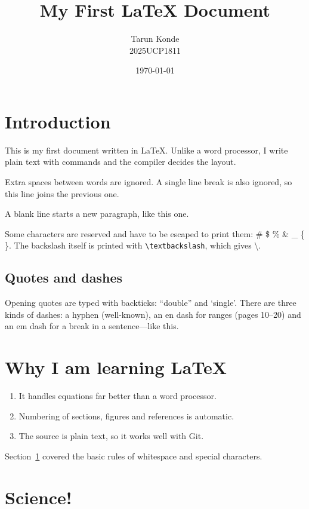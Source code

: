 \documentclass[12pt,a4paper]{article}
\title{My First \LaTeX{} Document}
\author{Tarun Konde \\ 2025UCP1811}
\date{\today}
\begin{document}
\maketitle
\tableofcontents

\section{Introduction}\label{sec:intro}

This is my first document written in \LaTeX. Unlike a word processor, I write
plain text with commands and the compiler decides the layout.

Extra    spaces between words     are ignored. A single line break is also
ignored, so this line joins the previous one.

A blank line starts a new paragraph, like this one.

Some characters are reserved and have to be escaped to print them:
\# \$ \% \& \_ \{ \}. The backslash itself is printed with
\verb|\textbackslash|, which gives \textbackslash.

\subsection{Quotes and dashes}

Opening quotes are typed with backticks: ``double'' and `single'.
There are three kinds of dashes: a hyphen (well-known), an en dash
for ranges (pages 10--20) and an em dash for a break in a sentence---like this.

\section{Why I am learning \LaTeX}\label{sec:why}

\begin{enumerate}
    \item It handles equations far better than a word processor.
    \item Numbering of sections, figures and references is automatic.
    \item The source is plain text, so it works well with Git.
\end{enumerate}

Section~\ref{sec:intro} covered the basic rules of whitespace and special
characters.

\section{Science!}\label{sec:science}
\end{document}
